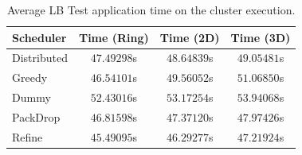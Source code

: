 \begin{table}[t]
	\centering
    \caption{Average LB Test application time on the cluster execution.}
	\begin{tabular}{l | c  c  c}
    	Scheduler & Time (Ring) & Time (2D) & Time (3D) \\ \hline
        Distributed & $47.49298$s & $48.64839$s & $49.05481$s \\
        Greedy & $46.54101$s & $49.56052$s & $51.06850$s \\
        Dummy & $52.43016$s & $53.17254$s & $53.94068$s \\
        PackDrop & $46.81598$s & $47.37120$s & $47.97426$s \\
        Refine & $45.49095$s & $46.29277$s & $47.21924$s \\		
	\end{tabular}
    \label{tab:lbtest:apptime}
\end{table}



